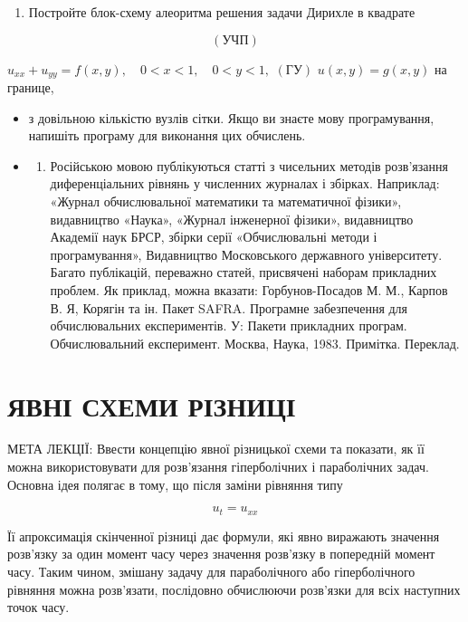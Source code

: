 \documentclass[
  ukrainian,
]{article}
\providecommand{\tightlist}{%
  \setlength{\itemsep}{0pt}\setlength{\parskip}{0pt}}
\begin{document}
\begin{enumerate}
\def\labelenumi{\arabic{enumi}.}
\setcounter{enumi}{5}
\tightlist
\item
  Постройте блок-схему алеоритма решения задачи Дирихле в квадрате
\end{enumerate}

\[
(\text{УЧП})
\]

\(u_{xx} + u_{yy} = f(x, y), \quad 0 < x < 1, \quad 0 < y < 1,\)
\((\text{ГУ})\) \(u(x, y) = g(x, y)\) на границе,

\begin{itemize}
\tightlist
\item
  з довільною кількістю вузлів сітки. Якщо ви знаєте мову програмування,
  напишіть програму для виконання цих обчислень.
\item
  \begin{enumerate}
  \def\labelenumi{\arabic{enumi})}
  \tightlist
  \item
    Російською мовою публікуються статті з чисельних методів розв'язання
    диференціальних рівнянь у численних журналах і збірках. Наприклад:
    «Журнал обчислювальної математики та математичної фізики»,
    видавництво «Наука», «Журнал інженерної фізики», видавництво
    Академії наук БРСР, збірки серії «Обчислювальні методи і
    програмування», Видавництво Московського державного університету.
    Багато публікацій, переважно статей, присвячені наборам прикладних
    проблем. Як приклад, можна вказати: Горбунов-Посадов М. М., Карпов
    В. Я, Корягін та ін. Пакет SAFRA. Програмне забезпечення для
    обчислювальних експериментів. У: Пакети прикладних програм.
    Обчислювальний експеримент. Москва, Наука, 1983. Примітка. Переклад.
  \end{enumerate}
\end{itemize}

\section{ЯВНІ СХЕМИ
РІЗНИЦІ}\label{ux44fux432ux43dux456-ux441ux445ux435ux43cux438-ux440ux456ux437ux43dux438ux446ux456}

МЕТА ЛЕКЦІЇ: Ввести концепцію явної різницької схеми та показати, як її
можна використовувати для розв'язання гіперболічних і параболічних
задач. Основна ідея полягає в тому, що після заміни рівняння типу

\[
u_t = u_{xx}
\]

Її апроксимація скінченної різниці дає формули, які явно виражають
значення розв'язку за один момент часу через значення розв'язку в
попередній момент часу. Таким чином, змішану задачу для параболічного
або гіперболічного рівняння можна розв'язати, послідовно обчислюючи
розв'язки для всіх наступних точок часу.
\end{document}
